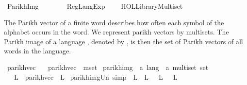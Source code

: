 %
\begin{isabellebody}%
%
%
\isadelimdocument
%
\endisadelimdocument
%
\isatagdocument
%
\isamarkuptrue%
%
\endisatagdocument
{\isafolddocument}%
%
\isadelimdocument
%
\endisadelimdocument
%
\isadelimtheory
%
\endisadelimtheory
%
\isatagtheory
{}\isamarkupfalse%
\ Parikh{\isacharunderscore}{\kern0pt}Img\isanewline
\ \ \ \isanewline
\ \ \ \ {\isachardoublequoteopen}Reg{\isacharunderscore}{\kern0pt}Lang{\isacharunderscore}{\kern0pt}Exp{\isachardoublequoteclose}\isanewline
\ \ \ \ {\isachardoublequoteopen}HOL{\isacharminus}{\kern0pt}Library{\isachardot}{\kern0pt}Multiset{\isachardoublequoteclose}\isanewline
{}%
\endisatagtheory
{\isafoldtheory}%
%
\isadelimtheory
%
\endisadelimtheory
%
\isadelimdocument
%
\endisadelimdocument
%
\isatagdocument
%
\isamarkuptrue%
%
\endisatagdocument
{\isafolddocument}%
%
\isadelimdocument
%
\endisadelimdocument
%
\begin{isamarkuptext}%
The Parikh vector of a finite word describes how often each symbol of the alphabet occurs in the word.
We represent parikh vectors by multisets. The Parikh image of a language , denoted by ,
is then the set of Parikh vectors of all words in the language.%
\end{isamarkuptext}\isamarkuptrue%
\isamarkupfalse%
\ parikh{\isacharunderscore}{\kern0pt}vec\ \isanewline
\ \ {\isachardoublequoteopen}parikh{\isacharunderscore}{\kern0pt}vec\ {\isasymequiv}\ mset{\isachardoublequoteclose}\isanewline
\isanewline
{}\isamarkupfalse%
\ parikh{\isacharunderscore}{\kern0pt}img\ {\isacharcolon}{\kern0pt}{\isacharcolon}{\kern0pt}\ {\isachardoublequoteopen}{\isacharprime}{\kern0pt}a\ lang\ {\isasymRightarrow}\ {\isacharprime}{\kern0pt}a\ multiset\ set{\isachardoublequoteclose}\ {\isacharparenleft}{\kern0pt}{\isachardoublequoteopen}{\isasymPsi}{\isachardoublequoteclose}{\isacharparenright}{\kern0pt}\ \isanewline
\ \ {\isachardoublequoteopen}{\isasymPsi}\ L\ {\isasymequiv}\ parikh{\isacharunderscore}{\kern0pt}vec\ {\isacharbackquote}{\kern0pt}\ L{\isachardoublequoteclose}\isanewline
\isanewline
{}\isamarkupfalse%
\ parikh{\isacharunderscore}{\kern0pt}img{\isacharunderscore}{\kern0pt}Un\ {\isacharbrackleft}{\kern0pt}simp{\isacharbrackright}{\kern0pt}{\isacharcolon}{\kern0pt}\ {\isachardoublequoteopen}{\isasymPsi}\ {\isacharparenleft}{\kern0pt}L{}\ {\isasymunion}\ L{}{\isacharparenright}{\kern0pt}\ {\isacharequal}{\kern0pt}\ {\isasymPsi}\ L{}\ {\isasymunion}\ {\isasymPsi}\ L{}{\isachardoublequoteclose}\isanewline

\end{isabellebody}
